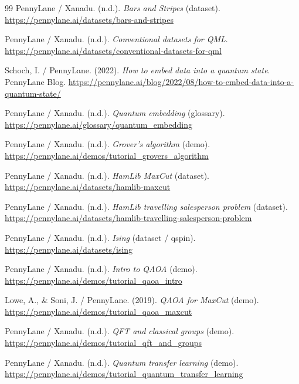 \begin{thebibliography}{99}
	PennyLane / Xanadu. (n.d.).
	\emph{Bars and Stripes} (dataset).
	\url{https://pennylane.ai/datasets/bars-and-stripes}

	PennyLane / Xanadu. (n.d.).
	\emph{Conventional datasets for QML}.
	\url{https://pennylane.ai/datasets/conventional-datasets-for-qml}

	Schoch, I. / PennyLane. (2022).
	\emph{How to embed data into a quantum state}.
	PennyLane Blog.
	\url{https://pennylane.ai/blog/2022/08/how-to-embed-data-into-a-quantum-state/}

	PennyLane / Xanadu. (n.d.).
	\emph{Quantum embedding} (glossary).
	\url{https://pennylane.ai/glossary/quantum_embedding}

	PennyLane / Xanadu. (n.d.).
	\emph{Grover's algorithm} (demo).
	\url{https://pennylane.ai/demos/tutorial_grovers_algorithm}

	PennyLane / Xanadu. (n.d.).
	\emph{HamLib MaxCut} (dataset).
	\url{https://pennylane.ai/datasets/hamlib-maxcut}

	PennyLane / Xanadu. (n.d.).
	\emph{HamLib travelling salesperson problem} (dataset).
	\url{https://pennylane.ai/datasets/hamlib-travelling-salesperson-problem}

	PennyLane / Xanadu. (n.d.).
	\emph{Ising} (dataset / qspin).
	\url{https://pennylane.ai/datasets/ising}

	PennyLane / Xanadu. (n.d.).
	\emph{Intro to QAOA} (demo).
	\url{https://pennylane.ai/demos/tutorial_qaoa_intro}

	Lowe, A., \& Soni, J. / PennyLane. (2019).
	\emph{QAOA for MaxCut} (demo).
	\url{https://pennylane.ai/demos/tutorial_qaoa_maxcut}

	PennyLane / Xanadu. (n.d.).
	\emph{QFT and classical groups} (demo).
	\url{https://pennylane.ai/demos/tutorial_qft_and_groups}

	PennyLane / Xanadu. (n.d.).
	\emph{Quantum transfer learning} (demo).
	\url{https://pennylane.ai/demos/tutorial_quantum_transfer_learning}


\end{thebibliography}
